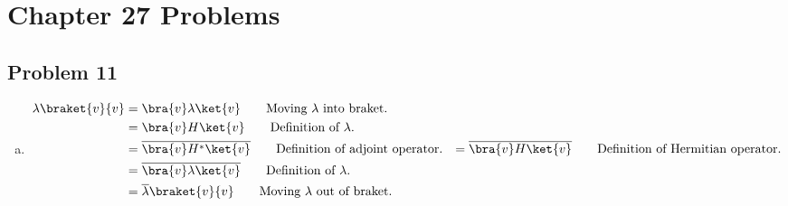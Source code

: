 \documentclass[10pt]{mypackage}
\begin{document}
\RaggedRight
\section{Chapter 27 Problems}%
\subsection{Problem 11}%
\begin{enumerate}[(a)]
  \item 
    \begin{align*}
      \lambda \braket{v}{v} &= \bra{v}\lambda \ket{v} \tag*{Moving $\lambda$ into braket.}\\
                            &= \bra{v}H\ket{v} \tag*{Definition of $\lambda$.}\\
                            &= \overline{\bra{v}H^{\ast}\ket{v}} \tag*{Definition of adjoint operator.}
                            &= \overline{\bra{v}H\ket{v}} \tag*{Definition of Hermitian operator.}\\
                            &= \overline{\bra{v}\lambda\ket{v}} \tag*{Definition of $\lambda$.}\\
                            &= \overline{\lambda}\braket{v}{v}\tag*{Moving $\lambda$ out of braket.}
    \end{align*}
    
\end{enumerate}
\end{document}
